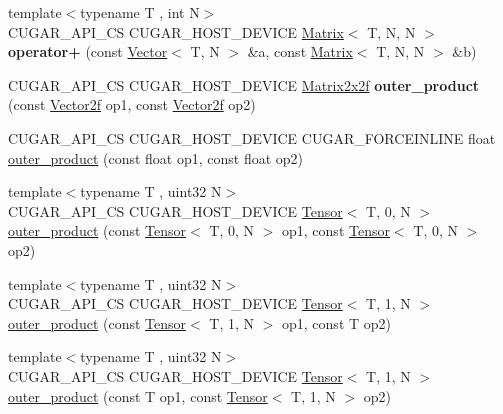 \begin{DoxyCompactItemize}
\item 
\mbox{\label{namespacecugar_a48cd7e45083b0af62d264675f781183a}} 
{\footnotesize template$<$typename T , int N$>$ }\\C\+U\+G\+A\+R\+\_\+\+A\+P\+I\+\_\+\+CS C\+U\+G\+A\+R\+\_\+\+H\+O\+S\+T\+\_\+\+D\+E\+V\+I\+CE \hyperlink{structcugar_1_1_matrix}{Matrix}$<$ T, N, N $>$ {\bfseries operator+} (const \hyperlink{structcugar_1_1_vector}{Vector}$<$ T, N $>$ \&a, const \hyperlink{structcugar_1_1_matrix}{Matrix}$<$ T, N, N $>$ \&b)
\item 
\mbox{\label{namespacecugar_ac386ab06597fd08c8b433714a1100028}} 
C\+U\+G\+A\+R\+\_\+\+A\+P\+I\+\_\+\+CS C\+U\+G\+A\+R\+\_\+\+H\+O\+S\+T\+\_\+\+D\+E\+V\+I\+CE \hyperlink{structcugar_1_1_matrix}{Matrix2x2f} {\bfseries outer\+\_\+product} (const \hyperlink{structcugar_1_1_vector}{Vector2f} op1, const \hyperlink{structcugar_1_1_vector}{Vector2f} op2)
\item 
C\+U\+G\+A\+R\+\_\+\+A\+P\+I\+\_\+\+CS C\+U\+G\+A\+R\+\_\+\+H\+O\+S\+T\+\_\+\+D\+E\+V\+I\+CE C\+U\+G\+A\+R\+\_\+\+F\+O\+R\+C\+E\+I\+N\+L\+I\+NE float \hyperlink{namespacecugar_a2090c3052f4356f6cc92254a89bda68f}{outer\+\_\+product} (const float op1, const float op2)
\item 
{\footnotesize template$<$typename T , uint32 N$>$ }\\C\+U\+G\+A\+R\+\_\+\+A\+P\+I\+\_\+\+CS C\+U\+G\+A\+R\+\_\+\+H\+O\+S\+T\+\_\+\+D\+E\+V\+I\+CE \hyperlink{structcugar_1_1_tensor}{Tensor}$<$ T, 0, N $>$ \hyperlink{namespacecugar_a6d6b45d49ae665be8211798090d0a329}{outer\+\_\+product} (const \hyperlink{structcugar_1_1_tensor}{Tensor}$<$ T, 0, N $>$ op1, const \hyperlink{structcugar_1_1_tensor}{Tensor}$<$ T, 0, N $>$ op2)
\item 
{\footnotesize template$<$typename T , uint32 N$>$ }\\C\+U\+G\+A\+R\+\_\+\+A\+P\+I\+\_\+\+CS C\+U\+G\+A\+R\+\_\+\+H\+O\+S\+T\+\_\+\+D\+E\+V\+I\+CE \hyperlink{structcugar_1_1_tensor}{Tensor}$<$ T, 1, N $>$ \hyperlink{namespacecugar_aac3278b75be815f53f0618ec82777ded}{outer\+\_\+product} (const \hyperlink{structcugar_1_1_tensor}{Tensor}$<$ T, 1, N $>$ op1, const T op2)
\item 
{\footnotesize template$<$typename T , uint32 N$>$ }\\C\+U\+G\+A\+R\+\_\+\+A\+P\+I\+\_\+\+CS C\+U\+G\+A\+R\+\_\+\+H\+O\+S\+T\+\_\+\+D\+E\+V\+I\+CE \hyperlink{structcugar_1_1_tensor}{Tensor}$<$ T, 1, N $>$ \hyperlink{namespacecugar_ace3dc76ae07309680d7e4a437df15948}{outer\+\_\+product} (const T op1, const \hyperlink{structcugar_1_1_tensor}{Tensor}$<$ T, 1, N $>$ op2)

\end{DoxyCompactItemize}

